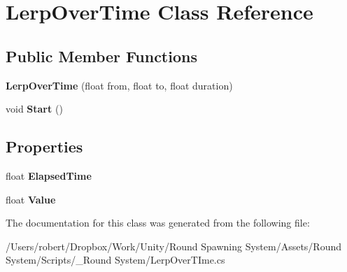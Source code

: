 \hypertarget{class_lerp_over_time}{}\section{Lerp\+Over\+Time Class Reference}
\label{class_lerp_over_time}
\subsection*{Public Member Functions}
\begin{DoxyCompactItemize}
\item 
\hypertarget{class_lerp_over_time_aec53f91814fbd94fd2fba29abfae7348}{}{\bfseries Lerp\+Over\+Time} (float from, float to, float duration)\label{class_lerp_over_time_aec53f91814fbd94fd2fba29abfae7348}

\item 
\hypertarget{class_lerp_over_time_a2ba0a3eb50979682a78b21615262af95}{}void {\bfseries Start} ()\label{class_lerp_over_time_a2ba0a3eb50979682a78b21615262af95}

\end{DoxyCompactItemize}
\subsection*{Properties}
\begin{DoxyCompactItemize}
\item 
\hypertarget{class_lerp_over_time_a7bb50fdc358f431501afae3842a71d4b}{}float {\bfseries Elapsed\+Time}\label{class_lerp_over_time_a7bb50fdc358f431501afae3842a71d4b}

\item 
\hypertarget{class_lerp_over_time_a97f891accf36443b605a0b8bcf70c643}{}float {\bfseries Value}\label{class_lerp_over_time_a97f891accf36443b605a0b8bcf70c643}

\end{DoxyCompactItemize}


The documentation for this class was generated from the following file\+:\begin{DoxyCompactItemize}
\item 
/\+Users/robert/\+Dropbox/\+Work/\+Unity/\+Round Spawning System/\+Assets/\+Round System/\+Scripts/\+\_\+\+Round System/Lerp\+Over\+T\+Ime.\+cs\end{DoxyCompactItemize}
